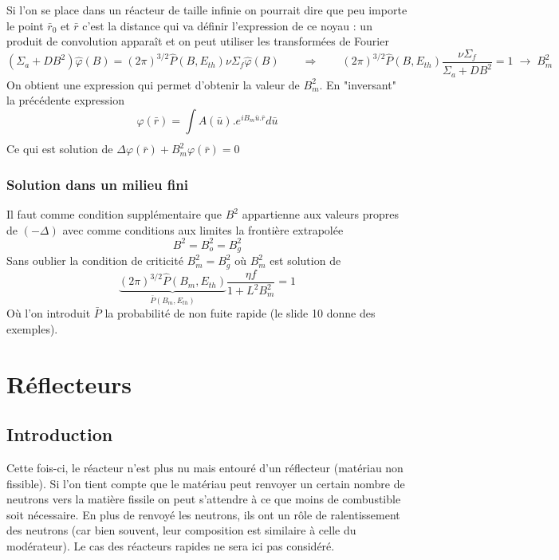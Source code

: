 Si l'on se place dans un réacteur de taille infinie on pourrait dire que peu importe le point 
$\bar r_0$ et $\bar r$ c'est la distance qui va définir l'expression de ce noyau : un produit de 
convolution apparaît et on peut utiliser les transformées de Fourier
\begin{equation}
({\Sigma _a} + D{B^2})\hat \varphi (B) = {(2\pi )^{3/2}}\hat P(B,{E_{th}})\nu {\Sigma _f}\hat \varphi (B)\qquad\Rightarrow\qquad {(2\pi )^{3/2}}\hat P(B,{E_{th}})\frac{{\nu {\Sigma _f}}}{{{\Sigma _a} + D{B^2}}} = 1\; \to \;B_m^2
\end{equation}
On obtient une expression qui permet d'obtenir la valeur de $B_m^2$. En "inversant" la précédente
expression 
\begin{equation}
\varphi (\bar r) = \int\limits_{}    A(\bar u).{e^{i{B_m}\bar u.\bar r}}d\bar u
\end{equation}
Ce qui est solution de $\Delta \varphi (\bar r) + B_m^2\varphi (\bar r) = 0$

\subsubsection{Solution dans un milieu fini}
Il faut comme condition supplémentaire que $B^2$ appartienne aux valeurs propres
de $(-\Delta)$ avec comme conditions aux limites la frontière extrapolée
\begin{equation}
{B^2} = B_o^2 = B_g^2
\end{equation}
Sans oublier la condition de criticité $B_m^2 = B_g^2$ où $B_m^2$ est solution de 
\begin{equation}
\underbrace{{(2\pi )^{3/2}}\hat P({B_m},{E_{th}})}_{\bar P(B_m,{E_{th}})}\frac{{\eta f}}{{1 + {L^2}B_m^2}} = 1
\end{equation}
Où l'on introduit $\bar{P}$ la probabilité de non fuite rapide (le slide 10 donne des exemples).

\newpage
\section{Réflecteurs}
\subsection{Introduction}
Cette fois-ci, le réacteur n'est plus nu mais entouré d'un réflecteur (matériau non fissible). Si 
l'on tient compte que le matériau peut renvoyer un certain nombre de neutrons vers la matière fissile 
on peut s'attendre à ce que moins de combustible soit nécessaire. En plus de renvoyé les neutrons, 
ils ont un rôle de ralentissement des neutrons (car bien souvent, leur composition est similaire à 
celle du modérateur). Le cas des réacteurs rapides ne sera ici pas considéré.


